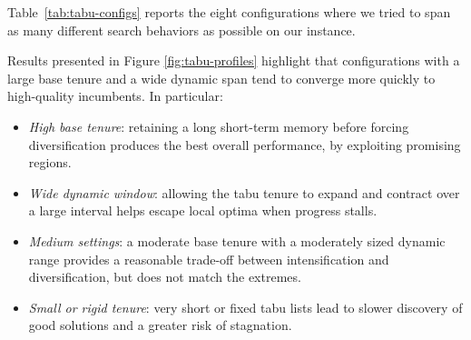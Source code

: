 Table~\ref{tab:tabu-configs} reports the eight configurations where we tried to span as many different search behaviors as possible on our instance.

\begin{table}[H]
  \centering
  \caption{Tabu Search configurations}
  \label{tab:tabu-configs}
\end{table}

Results presented in Figure \ref{fig:tabu-profiles} highlight that configurations with a large base tenure and a wide dynamic span tend to converge more quickly to high-quality incumbents. In particular:
\begin{itemize}
  \item \emph{High base tenure}: retaining a long short-term memory before forcing diversification produces the best overall performance, by exploiting promising regions.
  \item \emph{Wide dynamic window}: allowing the tabu tenure to expand and contract over a large interval helps escape local optima when progress stalls.
  \item \emph{Medium settings}: a moderate base tenure with a moderately sized dynamic range provides a reasonable trade-off between intensification and diversification, but does not match the extremes.
  \item \emph{Small or rigid tenure}: very short or fixed tabu lists lead to slower discovery of good solutions and a greater risk of stagnation.
\end{itemize}

